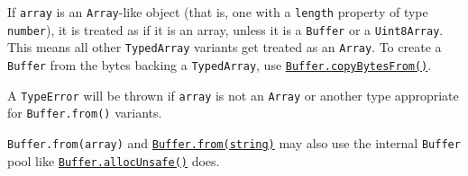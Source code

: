 \begin{Shaded}
\begin{Highlighting}[]
\NormalTok{ \{ }\NormalTok{ \} } \OperatorTok{;}

\OperatorTok{=} \NormalTok{([}\OperatorTok{,} \OperatorTok{,} \OperatorTok{,} \OperatorTok{,} \OperatorTok{,} \NormalTok{])}\OperatorTok{;}
\end{Highlighting}
\end{Shaded}

\begin{Shaded}
\begin{Highlighting}[]
\NormalTok{ \{ }\NormalTok{ \} }\OperatorTok{=} \NormalTok{(}\NormalTok{)}\OperatorTok{;}

\OperatorTok{=} \NormalTok{([}\OperatorTok{,} \OperatorTok{,} \OperatorTok{,} \OperatorTok{,} \OperatorTok{,} \NormalTok{])}\OperatorTok{;}
\end{Highlighting}
\end{Shaded}

If \texttt{array} is an \texttt{Array}-like object (that is, one with a
\texttt{length} property of type \texttt{number}), it is treated as if
it is an array, unless it is a \texttt{Buffer} or a \texttt{Uint8Array}.
This means all other \texttt{TypedArray} variants get treated as an
\texttt{Array}. To create a \texttt{Buffer} from the bytes backing a
\texttt{TypedArray}, use
\hyperref[static-method-buffercopybytesfromview-offset-length]{\texttt{Buffer.copyBytesFrom()}}.

A \texttt{TypeError} will be thrown if \texttt{array} is not an
\texttt{Array} or another type appropriate for \texttt{Buffer.from()}
variants.

\texttt{Buffer.from(array)} and
\hyperref[static-method-bufferfromstring-encoding]{\texttt{Buffer.from(string)}}
may also use the internal \texttt{Buffer} pool like
\hyperref[static-method-bufferallocunsafesize]{\texttt{Buffer.allocUnsafe()}}
does.

